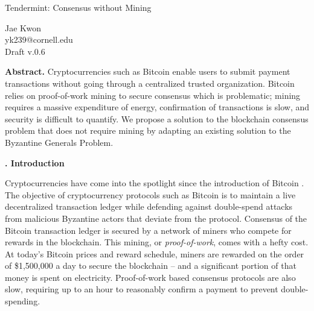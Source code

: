 \documentclass[letter,11pt]{article}
\newcounter{myseccnt}     %
\newcounter{mysubseccnt}  %
\newcommand{\mysection}[1]
{\vspace{9mm}\noindent\fontsize{13pt}{15pt}\setcounter{mysubseccnt}{0}
\stepcounter{myseccnt}\textbf{\arabic{myseccnt}. #1}\normalsize\vspace{5mm}}
\begin{document}
\begin{center}
 \fontsize{21pt}{24pt}\selectfont Tendermint: Consensus without Mining
\end{center}
\vspace{1mm}  

\begin{center}
Jae Kwon\\
yk239@cornell.edu\\
Draft v.0.6
\end{center}\vspace{1mm}

\begin{center}
 \fontsize{10pt}{12pt}\selectfont
 \parbox{0.8\textwidth}{\textbf{Abstract.} Cryptocurrencies such as Bitcoin enable users to submit payment transactions without going through a centralized trusted organization.  Bitcoin relies on proof-of-work mining to secure consensus which is problematic;  mining requires a massive expenditure of energy, confirmation of transactions is slow, and security is difficult to quantify.  We propose a solution to the blockchain consensus problem that does not require mining by adapting an existing solution to the Byzantine Generals Problem.}
\end{center}


\begin{algorithm}[H]
\end{algorithm}


\mysection{Introduction}

Cryptocurrencies have come into the spotlight since the introduction of Bitcoin \cite{conf:nakamoto}.  The objective of cryptocurrency protocols such as Bitcoin is to maintain a live decentralized transaction ledger while defending against double-spend attacks from malicious Byzantine actors that deviate from the protocol.  Consensus of the Bitcoin transaction ledger is secured by a network of miners who compete for rewards in the blockchain.  This mining, or \textit{proof-of-work}, comes with a hefty cost. At today’s Bitcoin prices and reward schedule, miners are rewarded on the order of \$1,500,000 a day to secure the blockchain – and a significant portion of that money is spent on electricity.  Proof-of-work based consensus protocols are also slow, requiring up to an hour to reasonably confirm a payment to prevent double-spending.\\
\end{document}
